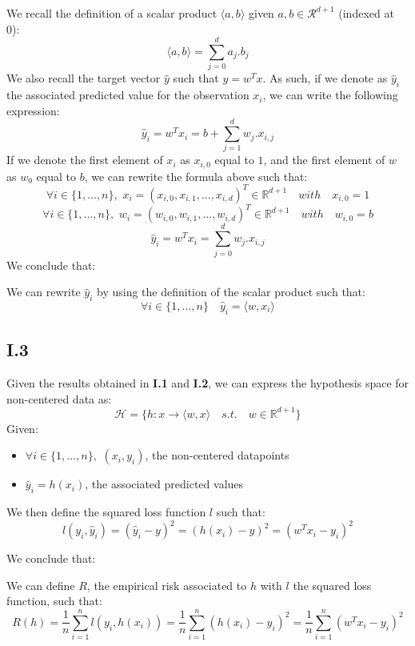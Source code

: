 \documentclass{homework}
\begin{document}
We recall the definition of a scalar product $\langle a, b\rangle$ given $a, b \in \mathcal{R}^{d+1}$ (indexed at 0):
$$\langle a, b\rangle = \overset{d}{\underset{j=0}{\sum}}a_j.b_j$$
We also recall the target vector $\hat{y}$ such that $y=w^Tx$. As such, if we denote as $\hat{y}_i$ the associated predicted value for the
observation $x_i$, we can write the following expression:
$$\hat{y}_i=w^Tx_i=b+\underset{j=1}{\overset{d}{\sum}}w_j.x_{i, j}$$
If we  denote the first element of $x_i$ as $x_{i, 0}$ equal to $1$, and the first element of $w$ as $w_0$ equal to $b$, we can
rewrite the formula above such that:
$$\forall i \in \{1, ..., n\},\,\, x_i=(x_{i, 0}, x_{i, 1}, ..., x_{i, d})^T\in\mathbb{R}^{d+1}\quad{with}\quad x_{i, 0}=1$$
$$\forall i \in \{1, ..., n\},\,\, w_i=(w_{i, 0}, w_{i, 1}, ..., w_{i, d})^T\in\mathbb{R}^{d+1}\quad{with}\quad w_{i, 0}=b$$
$$\hat{y}_i=w^Tx_i=\underset{j=0}{\overset{d}{\sum}}w_j.x_{i, j}$$
We conclude that:

\textcolor{OliveGreen}{We can rewrite $\hat{y}_i$ by using the definition of the scalar product such that:
$$\forall i\in\{1, ..., n\}\quad \hat{y}_i=\langle w, x_i\rangle$$}

\subsection*{I.3}

Given the results obtained in \textbf{I.1} and \textbf{I.2}, we can express the hypothesis space for non-centered data as:
$$\mathcal{H}=\{h:x\rightarrow\langle w, x\rangle \quad{s.t.}\quad w\in \mathbb{R}^{d+1}\}$$ 
Given:
\begin{itemize}
    \item $\forall i \in \{1, ..., n\},\,\, (x_i, y_i)$, the non-centered datapoints
    \item $\hat{y}_i=h(x_i)$, the associated predicted values
\end{itemize}

We then define the squared loss function $l$ such that:
$$l(y_i, \hat{y}_i)=(\hat{y}_i - y)^2 = (h(x_i) - y)^2=(w^Tx_i-y_i)^2$$

We conclude that:

\textcolor{OliveGreen}{We can define $R$, the empirical risk associated to $h$ with $l$ the squared loss function, such that:
$$R(h)=\frac{1}{n}\underset{i=1}{\overset{n}{\sum}}l(y_i, h(x_i))=\frac{1}{n}\underset{i=1}{\overset{n}{\sum}}(h(x_i)-y_i)^2=\frac{1}{n}\underset{i=1}{\overset{n}{\sum}}(w^Tx_i-y_i)^2$$}
\end{document}
